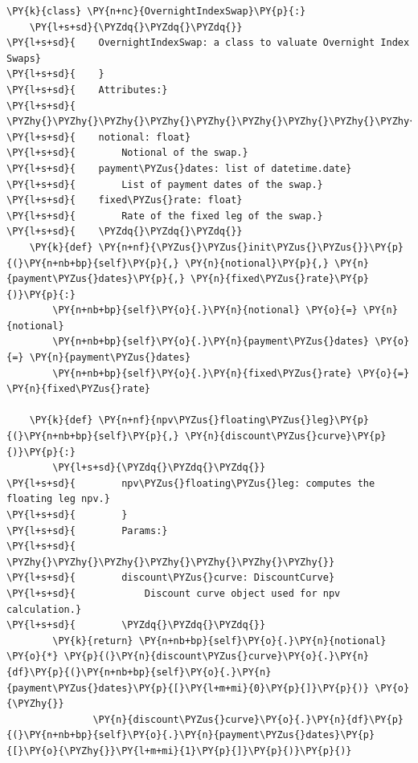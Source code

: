 \begin{tcolorbox}[breakable, size=fbox, boxrule=1pt, pad at break*=1mm,colback=cellbackground, colframe=cellborder]
\begin{Verbatim}[commandchars=\\\{\}]
\PY{k}{class} \PY{n+nc}{OvernightIndexSwap}\PY{p}{:}
    \PY{l+s+sd}{\PYZdq{}\PYZdq{}\PYZdq{}}
\PY{l+s+sd}{    OvernightIndexSwap: a class to valuate Overnight Index Swaps}
\PY{l+s+sd}{    }
\PY{l+s+sd}{    Attributes:}
\PY{l+s+sd}{    \PYZhy{}\PYZhy{}\PYZhy{}\PYZhy{}\PYZhy{}\PYZhy{}\PYZhy{}\PYZhy{}\PYZhy{}\PYZhy{}\PYZhy{}}
\PY{l+s+sd}{    notional: float}
\PY{l+s+sd}{        Notional of the swap.}
\PY{l+s+sd}{    payment\PYZus{}dates: list of datetime.date}
\PY{l+s+sd}{        List of payment dates of the swap.}
\PY{l+s+sd}{    fixed\PYZus{}rate: float}
\PY{l+s+sd}{        Rate of the fixed leg of the swap.}
\PY{l+s+sd}{    \PYZdq{}\PYZdq{}\PYZdq{}}
    \PY{k}{def} \PY{n+nf}{\PYZus{}\PYZus{}init\PYZus{}\PYZus{}}\PY{p}{(}\PY{n+nb+bp}{self}\PY{p}{,} \PY{n}{notional}\PY{p}{,} \PY{n}{payment\PYZus{}dates}\PY{p}{,} \PY{n}{fixed\PYZus{}rate}\PY{p}{)}\PY{p}{:}
        \PY{n+nb+bp}{self}\PY{o}{.}\PY{n}{notional} \PY{o}{=} \PY{n}{notional}
        \PY{n+nb+bp}{self}\PY{o}{.}\PY{n}{payment\PYZus{}dates} \PY{o}{=} \PY{n}{payment\PYZus{}dates}
        \PY{n+nb+bp}{self}\PY{o}{.}\PY{n}{fixed\PYZus{}rate} \PY{o}{=} \PY{n}{fixed\PYZus{}rate}

    \PY{k}{def} \PY{n+nf}{npv\PYZus{}floating\PYZus{}leg}\PY{p}{(}\PY{n+nb+bp}{self}\PY{p}{,} \PY{n}{discount\PYZus{}curve}\PY{p}{)}\PY{p}{:}
        \PY{l+s+sd}{\PYZdq{}\PYZdq{}\PYZdq{}}
\PY{l+s+sd}{        npv\PYZus{}floating\PYZus{}leg: computes the floating leg npv.}
\PY{l+s+sd}{        }
\PY{l+s+sd}{        Params:}
\PY{l+s+sd}{        \PYZhy{}\PYZhy{}\PYZhy{}\PYZhy{}\PYZhy{}\PYZhy{}\PYZhy{}}
\PY{l+s+sd}{        discount\PYZus{}curve: DiscountCurve}
\PY{l+s+sd}{            Discount curve object used for npv calculation.}
\PY{l+s+sd}{        \PYZdq{}\PYZdq{}\PYZdq{}}
        \PY{k}{return} \PY{n+nb+bp}{self}\PY{o}{.}\PY{n}{notional} \PY{o}{*} \PY{p}{(}\PY{n}{discount\PYZus{}curve}\PY{o}{.}\PY{n}{df}\PY{p}{(}\PY{n+nb+bp}{self}\PY{o}{.}\PY{n}{payment\PYZus{}dates}\PY{p}{[}\PY{l+m+mi}{0}\PY{p}{]}\PY{p}{)} \PY{o}{\PYZhy{}}
               \PY{n}{discount\PYZus{}curve}\PY{o}{.}\PY{n}{df}\PY{p}{(}\PY{n+nb+bp}{self}\PY{o}{.}\PY{n}{payment\PYZus{}dates}\PY{p}{[}\PY{o}{\PYZhy{}}\PY{l+m+mi}{1}\PY{p}{]}\PY{p}{)}\PY{p}{)}


\end{Verbatim}
\end{tcolorbox}
